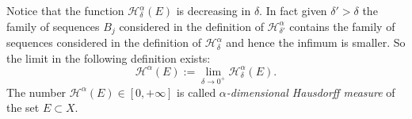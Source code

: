 \documentclass[12pt]{article}
\renewcommand{\H}{\mathcal H}
\begin{document}
Notice that the function $\H^\alpha_\delta(E)$ is decreasing in $\delta$. In fact given $\delta'>\delta$ the family of sequences $B_j$ considered in the definition of $\H^\alpha_{\delta'}$ contains  the family of sequences considered  in the definition of $\H^\alpha_\delta$ and hence the infimum is smaller. 
So the limit in the following definition exists:
\begin{equation}\label{defH}
\H^\alpha(E):=\lim_{\delta\to 0^+} \H^\alpha_\delta(E).
\end{equation}
The number $\H^\alpha(E)\in [0,+\infty]$ is called \emph{$\alpha$-dimensional Hausdorff measure} of the set $E\subset X$.
\end{document}
